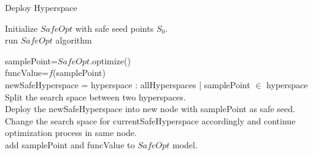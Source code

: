\begin{algorithm}
	\SetAlgoVlined
	\caption{Deploy Hyperspace}
	Initialize $SafeOpt$ with safe seed points $S_0$.\\
	{
		{
			run $SafeOpt$ algorithm
		}
		\KwRet{}
	}
	{
		samplePoint=$SafeOpt$.optimize()\\
		funcValue=$f$(samplePoint)\\
		newSafeHyperspace = hyperspace : allHyperspaces | samplePoint $\in$ hyperspace\\
		{
			Split the search space between two hyperspaces.\\
			Deploy the newSafeHyperspace into new node with samplePoint as safe seed.\\
			Change the search space for currentSafeHyperspace accordingly and continue optimization process in same node.\\
		}
		{
			add samplePoint and funcValue to $SafeOpt$ model.
		}
		
	}
\end{algorithm}
